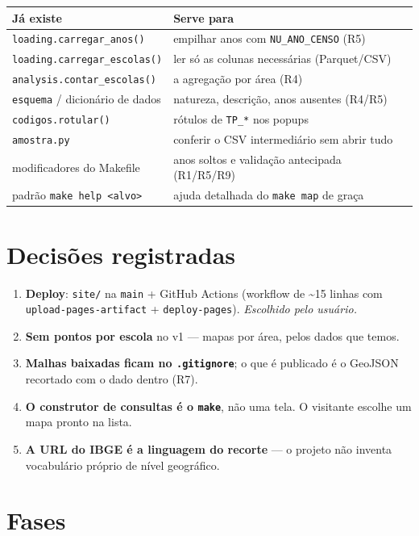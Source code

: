 \documentclass[11pt]{article}
\begin{document}
\begin{center}
\begin{tabular}{ll}
Já existe & Serve para\\
\hline
\texttt{loading.carregar\_anos()} & empilhar anos com \texttt{NU\_ANO\_CENSO} (R5)\\
\texttt{loading.carregar\_escolas()} & ler só as colunas necessárias (Parquet/CSV)\\
\texttt{analysis.contar\_escolas()} & a agregação por área (R4)\\
\texttt{esquema} / dicionário de dados & natureza, descrição, anos ausentes (R4/R5)\\
\texttt{codigos.rotular()} & rótulos de \texttt{TP\_*} nos popups\\
\texttt{amostra.py} & conferir o CSV intermediário sem abrir tudo\\
modificadores do Makefile & anos soltos e validação antecipada (R1/R5/R9)\\
padrão \texttt{make help <alvo>} & ajuda detalhada do \texttt{make map} de graça\\
\end{tabular}
\end{center}
\section{Decisões registradas}
\label{sec:orgad68be9}

\begin{enumerate}
\item \textbf{Deploy}: \texttt{site/} na \texttt{main} + GitHub Actions (workflow de \textasciitilde{}15 linhas com
\texttt{upload-pages-artifact} + \texttt{deploy-pages}). \emph{Escolhido pelo usuário.}
\item \textbf{Sem pontos por escola} no v1 — mapas por área, pelos dados que temos.
\item \textbf{Malhas baixadas ficam no \texttt{.gitignore}}; o que é publicado é o GeoJSON
recortado com o dado dentro (R7).
\item \textbf{O construtor de consultas é o \texttt{make}}, não uma tela. O visitante escolhe
um mapa pronto na lista.
\item \textbf{A URL do IBGE é a linguagem do recorte} — o projeto não inventa
vocabulário próprio de nível geográfico.
\end{enumerate}
\section{Fases}
\label{sec:org48d4936}
\end{document}
